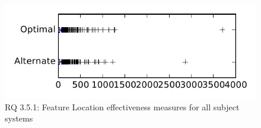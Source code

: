 
\begin{figure}
\centering
\includegraphics[height=0.4\textheight]{figures/combo/flt_rq1_tiny}
\caption{RQ 3.5.1: Feature Location effectiveness measures for all subject systems}
\label{fig:flt:rq1:tiny}
\end{figure}
